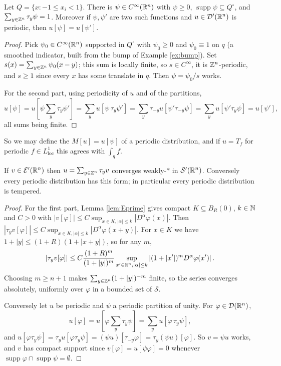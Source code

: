 \documentclass[a4paper]{scrartcl}
\newcommand{\Sch}{\mathcal{S}}
\newcommand{\Ecal}{\mathcal{E}}
\DeclareMathOperator{\supp}{supp}
\begin{document}
\begin{lemma}\label{lem:partunity}
	Let $Q=\{x:-1\le x_i<1\}$. There is $\psi\in C^\infty(\mathbb{R}^n)$ with $\psi\ge0$, $\supp\psi\subseteq Q^\circ$, and $\sum_{y\in\mathbb{Z}^n}\tau_y\psi=1$. Moreover if $\psi,\psi'$ are two such functions and $u\in\mathcal{D}'(\mathbb{R}^n)$ is periodic, then $u[\psi]=u[\psi']$.
\end{lemma}

\begin{proof}
	Pick $\psi_0\in C^\infty(\mathbb{R}^n)$ supported in $Q^\circ$ with $\psi_0\ge0$ and $\psi_0\equiv1$ on $q$ (a smoothed indicator, built from the bump of Example \ref{ex:bump}). Set $s(x)=\sum_{y\in\mathbb{Z}^n}\psi_0(x-y)$; this sum is locally finite, so $s\in C^\infty$, it is $\mathbb{Z}^n$-periodic, and $s \ge 1$ since every $x$ has some translate in $q$. Then $\psi=\psi_0/s$ works.

	For the second part, using periodicity of $u$ and of the partitions,
	$$u[\psi]=u\!\left[\psi\sum_{y}\tau_y\psi'\right]=\sum_yu[\psi\,\tau_y\psi']=\sum_y\tau_{-y}u[\psi'\tau_{-y}\psi]=\sum_yu[\psi'\tau_y\psi]=u[\psi'],$$
	all sums being finite.
\end{proof}

So we may define the  $M[u]=u[\psi]$ of a periodic distribution, and if $u = T_f$ for periodic $f\in L^1_{\mathrm{loc}}$ this agrees with $\int_qf$.

\begin{lemma}\label{lem:periodictempered}
	If $v\in\Ecal'(\R^n)$ then $u=\sum_{y\in\mathbb{Z}^n}\tau_yv$ converges weakly-$*$ in $\Sch'(\R^n)$. Conversely every periodic distribution has this form; in particular every periodic distribution is tempered.
\end{lemma}

\begin{proof}
	For the first part, Lemma \ref{lem:Eprime} gives compact $K \subseteq B_R(0)$, $k\in\mathbb{N}$ and $C>0$ with $|v[\varphi]|\le C\sup_{x\in K,|\alpha|\le k}|D^\alpha\varphi(x)|$. Then $|\tau_yv[\varphi]|\le C\sup_{x\in K,|\alpha|\le k}|D^\alpha\varphi(x+y)|$. For $x \in K$ we have $1+|y|\le(1+R)(1+|x+y|)$, so for any $m$,
	$$|\tau_yv[\varphi]|\le C\frac{(1+R)^m}{(1+|y|)^m}\sup_{x'\in\mathbb{R}^n,|\alpha|\le k}\left|(1+|x'|)^mD^\alpha\varphi(x')\right|.$$
	Choosing $m \ge n+1$ makes $\sum_{y\in\mathbb{Z}^n}(1+|y|)^{-m}$ finite, so the series converges absolutely, uniformly over $\varphi$ in a bounded set of $\Sch$.

	Conversely let $u$ be periodic and $\psi$ a periodic partition of unity. For $\varphi\in\mathcal{D}(\mathbb{R}^n)$,
	$$u[\varphi]=u\!\left[\varphi\sum_y\tau_y\psi\right]=\sum_yu[\varphi\,\tau_y\psi],$$
	and $u[\varphi\tau_y\psi]=\tau_yu[\varphi\tau_y\psi]=(\psi u)[\tau_{-y}\varphi]=\tau_y(\psi u)[\varphi]$. So $v=\psi u$ works, and $v$ has compact support since $v[\varphi]=u[\psi\varphi]=0$ whenever $\supp\varphi\cap\supp\psi=\emptyset$.
\end{proof}
\end{document}
